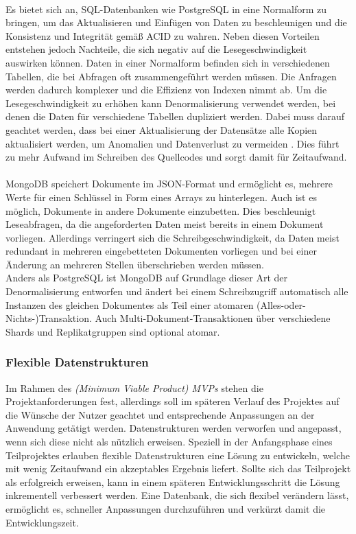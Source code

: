 \paragraph{}
Es bietet sich an, SQL-Datenbanken wie PostgreSQL in eine Normalform zu bringen, um das Aktualisieren und Einfügen von Daten zu beschleunigen und die Konsistenz und Integrität gemäß ACID zu wahren.
Neben diesen Vorteilen entstehen jedoch Nachteile, die sich negativ auf die Lesegeschwindigkeit auswirken können.
Daten in einer Normalform befinden sich in verschiedenen Tabellen, die bei Abfragen oft zusammengeführt werden müssen.
Die Anfragen werden dadurch komplexer und die Effizienz von Indexen nimmt ab.
Um die Lesegeschwindigkeit zu erhöhen kann Denormalisierung verwendet werden, bei denen die Daten für verschiedene Tabellen dupliziert werden.
Dabei muss darauf geachtet werden, dass bei einer Aktualisierung der Datensätze alle Kopien aktualisiert werden, um Anomalien und Datenverlust zu vermeiden \cite{db:denormalization}.
Dies führt zu mehr Aufwand im Schreiben des Quellcodes und sorgt damit für Zeitaufwand.


\paragraph{}
MongoDB speichert Dokumente im JSON-Format und ermöglicht es, mehrere Werte für einen Schlüssel in Form eines Arrays zu hinterlegen.
Auch ist es möglich, Dokumente in andere Dokumente einzubetten. \cite{db:mongoEmbeddedDocuments}
Dies beschleunigt Leseabfragen, da die angeforderten Daten meist bereits in einem Dokument vorliegen.
Allerdings verringert sich die Schreibgeschwindigkeit, da Daten meist redundant in mehreren eingebetteten Dokumenten vorliegen und bei einer Änderung an mehreren Stellen überschrieben werden müssen.\\
Anders als PostgreSQL ist MongoDB auf Grundlage dieser Art der Denormalisierung entworfen und ändert bei einem Schreibzugriff automatisch alle Instanzen des gleichen Dokumentes als Teil einer atomaren (Alles-oder-Nichts-)Transaktion.
Auch Multi-Dokument-Transaktionen über verschiedene Shards und Replikatgruppen sind optional atomar. \cite{db:mongoAcidCompliance}

\subsubsection{Flexible Datenstrukturen}
Im Rahmen des \textit{(Minimum Viable Product) MVPs} stehen die Projektanforderungen fest, allerdings soll im späteren Verlauf des Projektes auf die Wünsche der Nutzer geachtet und entsprechende Anpassungen an der Anwendung getätigt werden.
Datenstrukturen werden verworfen und angepasst, wenn sich diese nicht als nützlich erweisen.
Speziell in der Anfangsphase eines Teilprojektes erlauben flexible Datenstrukturen eine Lösung zu entwickeln, welche mit wenig Zeitaufwand ein akzeptables Ergebnis liefert.
Sollte sich das Teilprojekt als erfolgreich erweisen, kann in einem späteren Entwicklungsschritt die Lösung inkrementell verbessert werden.
Eine Datenbank, die sich flexibel verändern lässt, ermöglicht es, schneller Anpassungen durchzuführen und verkürzt damit die Entwicklungszeit.

